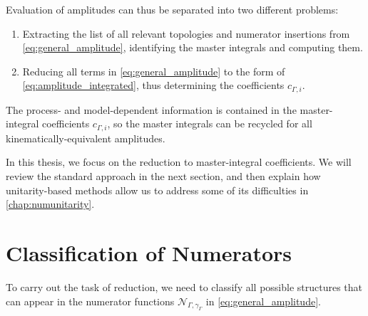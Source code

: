 Evaluation of amplitudes can thus be separated into two different problems:
\begin{enumerate}
  \item Extracting  the list of all relevant topologies and numerator insertions from \cref{eq:general_amplitude},
    identifying the master integrals and computing them.
  \item Reducing all terms in \cref{eq:general_amplitude} to the form of \cref{eq:amplitude_integrated}, thus
    determining the coefficients $c_{\Gamma,i}$.
\end{enumerate}
The process- and model-dependent information is contained in the master-integral coefficients $c_{\Gamma,i}$,
so the master integrals can be recycled for all kinematically-equivalent amplitudes.

In this thesis, we focus on the reduction to master-integral coefficients.
We will review the standard approach in the next section, and
then explain how unitarity-based methods allow us to address some of its difficulties in \cref{chap:numunitarity}.

\section{Classification of Numerators}
\label{sec:classification_numerators}

To carry out the task of reduction,
we need to classify all possible structures that can appear in the numerator functions $\mathcal{N}_{\Gamma,\gamma_\Gamma}$ in \cref{eq:general_amplitude}.

